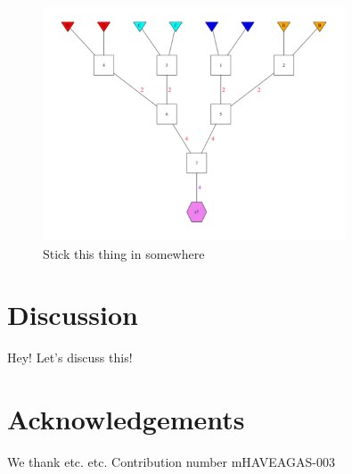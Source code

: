 \begin{figure}
\begin{center}
\includegraphics[width=0.8\textwidth]{images/gsp4-700.pdf}
\end{center}
\caption[]{Stick this thing in somewhere}
\end{figure}




\section*{Discussion}
Hey! Let's discuss this!



\section*{Acknowledgements}
We thank etc. etc.   Contribution number  mHAVEAGAS-003